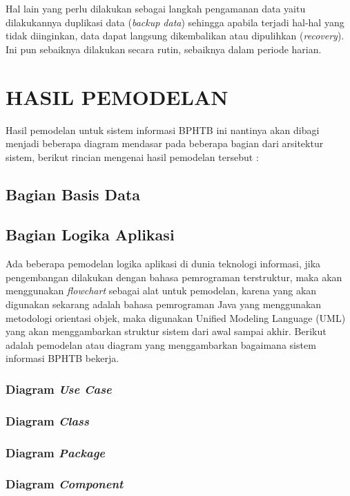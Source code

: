 \documentclass[pdftex,12pt, oneside]{article}
\begin{document}
Hal lain yang perlu dilakukan sebagai langkah pengamanan data yaitu dilakukannya duplikasi data (\textit{backup data}) sehingga apabila terjadi hal-hal yang tidak diinginkan, data dapat langsung dikembalikan atau dipulihkan (\textit{recovery}). Ini pun sebaiknya dilakukan secara rutin, sebaiknya dalam periode harian.

\section{HASIL PEMODELAN}

Hasil pemodelan untuk sistem informasi BPHTB ini nantinya akan dibagi menjadi beberapa diagram mendasar pada beberapa bagian dari arsitektur sistem, berikut rincian mengenai hasil pemodelan tersebut :

\subsection{Bagian Basis Data}

\subsection{Bagian Logika Aplikasi}

Ada beberapa pemodelan logika aplikasi di dunia teknologi informasi, jika pengembangan dilakukan dengan bahasa pemrograman terstruktur, maka akan menggunakan \textit{flowchart} sebagai alat untuk pemodelan, karena yang akan digunakan sekarang adalah bahasa pemrograman Java yang menggunakan metodologi orientasi objek, maka digunakan Unified Modeling Language (UML) yang akan menggambarkan struktur sistem dari awal sampai akhir. Berikut adalah pemodelan atau diagram yang menggambarkan bagaimana sistem informasi BPHTB bekerja.

\subsubsection{Diagram \textit{Use Case}}

\subsubsection{Diagram \textit{Class}}

\subsubsection{Diagram \textit{Package}}

\subsubsection{Diagram \textit{Component}}
\end{document}
